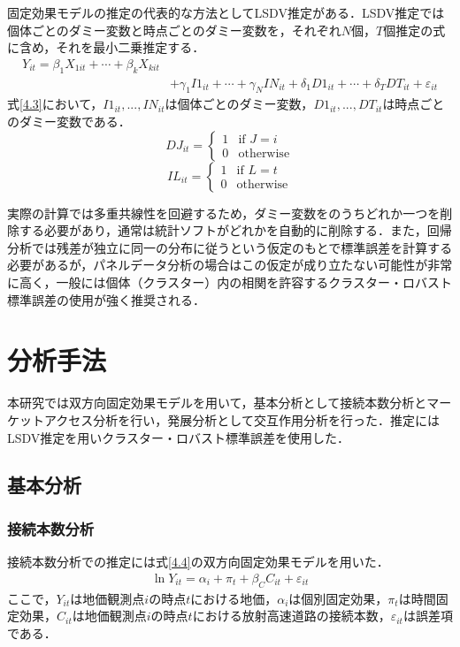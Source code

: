 固定効果モデルの推定の代表的な方法としてLSDV推定がある．LSDV推定では個体ごとのダミー変数と時点ごとのダミー変数を，それぞれ$N$個，$T$個推定の式に含め，それを最小二乗推定する．
\begin{equation}
  \begin{aligned}
    Y_{it} = \beta_{1}X_{1it} + \cdots  + \beta_{k}X_{kit} \\
    &+ \gamma_{1}I1_{it} + \cdots + \gamma_{N}IN_{it} + \delta_{1}D1_{it} + \cdots + \delta_{T}DT_{it} + \varepsilon_{it}
  \end{aligned}
  \label{4.3} 
\end{equation}
式\ref{4.3}において，$I1_{it},...,IN_{it}$は個体ごとのダミー変数，$D1_{it},...,DT_{it}$は時点ごとのダミー変数である．
\begin{equation}
  DJ_{it} =
  \begin{cases}
    1 & \text{if } J = i \\
    0 & \text{otherwise}
  \end{cases}
\end{equation}
\begin{equation}
  IL_{it} =
  \begin{cases}
    1 & \text{if } L = t \\
    0 & \text{otherwise}
  \end{cases}
\end{equation}

実際の計算では多重共線性を回避するため，ダミー変数をのうちどれか一つを削除する必要があり，通常は統計ソフトがどれかを自動的に削除する．また，回帰分析では残差が独立に同一の分布に従うという仮定のもとで標準誤差を計算する必要があるが，パネルデータ分析の場合はこの仮定が成り立たない可能性が非常に高く，一般には個体（クラスター）内の相関を許容するクラスター・ロバスト標準誤差の使用が強く推奨される．

\section{分析手法}
本研究では双方向固定効果モデルを用いて，基本分析として接続本数分析とマーケットアクセス分析を行い，発展分析として交互作用分析を行った．推定にはLSDV推定を用いクラスター・ロバスト標準誤差を使用した．
\subsection{基本分析}
\subsubsection{接続本数分析}
接続本数分析での推定には式\ref{4.4}の双方向固定効果モデルを用いた．
\begin{eqnarray}
    \ln{Y_{it}}= \alpha_{i} + \pi_{t} + \beta_{C}C_{it} + \varepsilon_{it}
  \label{4.4}
\end{eqnarray}
ここで，$Y_{it}$は地価観測点$i$の時点$t$における地価，$\alpha_{i}$は個別固定効果，$\pi_{t}$は時間固定効果，$C_{it}$は地価観測点$i$の時点$t$における放射高速道路の接続本数，$\varepsilon_{it}$は誤差項である．

